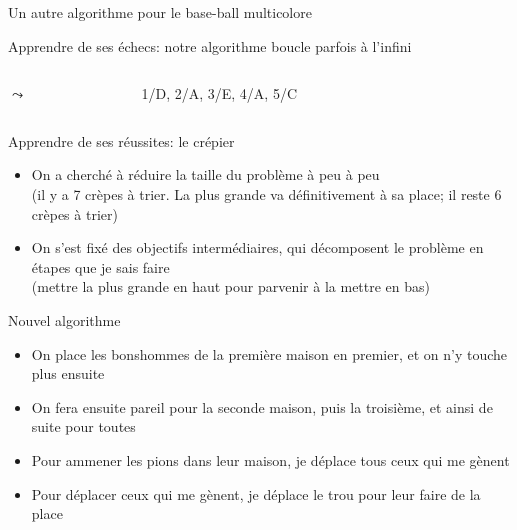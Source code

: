 \documentclass[final,hyperref={pdfpagelabels=false}]{beamer}
\renewenvironment{Coupe}{   }{   }
\renewcommand*{\Large}{\fontsize{\resultLargeX}{\resultLargeY}\selectfont}
\begin{document}
\begin{Coupe}
\begin{frame}{Un autre algorithme pour le base-ball multicolore}
\begin{block}{Apprendre de ses échecs: {\color{black}notre algorithme boucle parfois à l'infini}}
\begin{columns}
      \begin{column}{.1\linewidth}\center
        \Large$\leadsto$
      \end{column}

      \begin{column}{.2\linewidth}\center
                    {1/D, 2/A, 3/E, 4/A, 5/C}
      \end{column}
      \begin{column}{.2\linewidth}
        ~
      \end{column}
    \end{columns}
  \end{block}

  \bigskip

  \begin{block}{Apprendre de ses réussites: {\color{black}le crépier}}
    \begin{itemize}\vspace{-.2\baselineskip}
    \item On a cherché à réduire la taille du problème à peu à peu\\
      {(il y a 7 crèpes à trier. La plus grande va définitivement à sa place; il
        reste 6 crèpes à trier)}
    \item On s'est fixé des objectifs intermédiaires, qui décomposent le
      problème en étapes que je sais faire\\
      {(mettre la plus grande en haut pour parvenir à la mettre en bas)}
    \end{itemize}
  \end{block}

  \begin{block}{Nouvel algorithme}
    \begin{itemize}\vspace{-.2\baselineskip}
    \item On place les bonshommes de la première maison en premier, et on n'y
      touche plus ensuite
    \item On fera ensuite pareil pour la seconde maison, puis la troisième, et
      ainsi de suite pour toutes
    \item Pour ammener les pions  dans leur maison, je déplace tous
      ceux qui me gènent
    \item Pour déplacer ceux qui me gènent, je déplace le trou pour leur faire de
      la place
    \end{itemize}
  \end{block}
  \begin{columns}


\end{columns}
\end{frame}
\end{Coupe}
\end{document}
